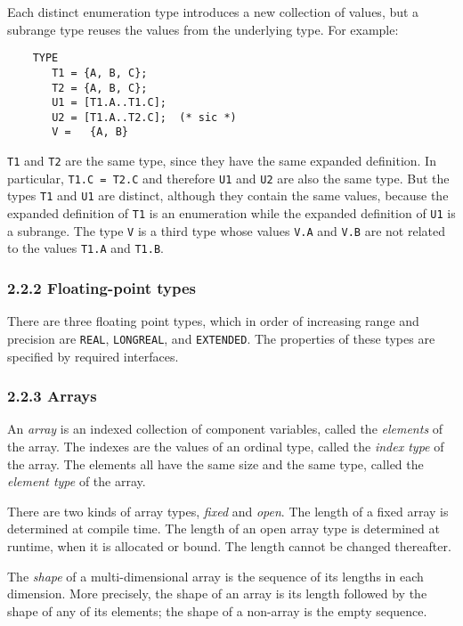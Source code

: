 \documentclass[10pt]{article}
\begin{document}
Each distinct enumeration type introduces a new collection of values, but a
subrange type reuses the values from the underlying type.  For example:
\begin{verbatim}
    TYPE
       T1 = {A, B, C};
       T2 = {A, B, C};
       U1 = [T1.A..T1.C];
       U2 = [T1.A..T2.C];  (* sic *)
       V =   {A, B}
\end{verbatim}
\verb|T1| and \verb|T2| are the same type, since they have the same expanded
definition.  In particular, \verb|T1.C = T2.C| and therefore \verb|U1| and
\verb|U2| are also the same type.  But the types \verb|T1| and \verb|U1| are
distinct, although they contain the same values, because the expanded
definition of \verb|T1| is an enumeration while the expanded definition of
\verb|U1| is a subrange.  The type \verb|V| is a third type whose values
\verb|V.A| and \verb|V.B| are not related to the values \verb|T1.A| and
\verb|T1.B|.

\subsubsection*{2.2.2 Floating-point types}

There are three floating point types, which in order of increasing range and
precision are \verb|REAL|, \verb|LONGREAL|, and \verb|EXTENDED|.  The
properties of these types are specified by required interfaces.

\subsubsection*{2.2.3 Arrays}

An \emph{array} is an indexed collection of component variables, called the
\emph{elements} of the array.  The indexes are the values of an ordinal type,
called the \emph{index type} of the array.  The elements all have the same
size and the same type, called the \emph{element type} of the array.

There are two kinds of array types, \emph{fixed} and \emph{open}.  The length
of a fixed array is determined at compile time.  The length of an open array
type is determined at runtime, when it is allocated or bound.  The length
cannot be changed thereafter.

The \emph{shape} of a multi-dimensional array is the sequence of its lengths
in each dimension.  More precisely, the shape of an array is its length
followed by the shape of any of its elements; the shape of a non-array is the
empty sequence.
\end{document}
